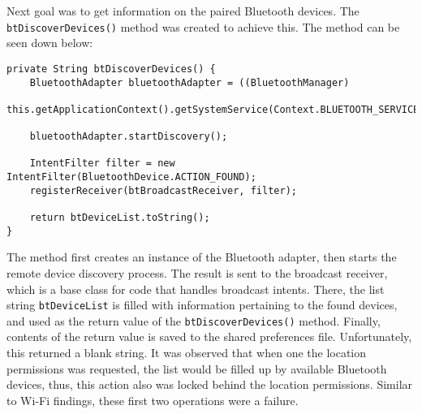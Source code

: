 \documentclass[
  a4paper,  %
  twoside,  %
  bibliography=totoc,
  headsepline,
  cleardoublepage=empty,
  parskip=half,
  draft=false,
  open=any
]{scrbook}
\begin{document}
Next goal was to get information on the paired Bluetooth devices. The \texttt{btDiscoverDevices()} method was created to achieve this. The method can be seen down below:
\begin{lstlisting}
private String btDiscoverDevices() {
	BluetoothAdapter bluetoothAdapter = ((BluetoothManager)
	this.getApplicationContext().getSystemService(Context.BLUETOOTH_SERVICE)).getAdapter();

	bluetoothAdapter.startDiscovery();

	IntentFilter filter = new IntentFilter(BluetoothDevice.ACTION_FOUND);
	registerReceiver(btBroadcastReceiver, filter);

	return btDeviceList.toString();
}
\end{lstlisting} 
The method first creates an instance of the Bluetooth adapter, then starts the remote device discovery process. The result is sent to the broadcast receiver, which is a base class for code that handles broadcast intents. There, the list string \texttt{btDeviceList} is filled with information pertaining to the found devices, and used as the return value of the \texttt{btDiscoverDevices()} method. Finally, contents of the return value is saved to the shared preferences file. Unfortunately, this returned a blank string. It was observed that when one the location permissions was requested, the list would be filled up by available Bluetooth devices, thus, this action also was locked behind the location permissions. Similar to Wi-Fi findings, these first two operations were a failure.
\end{document}
